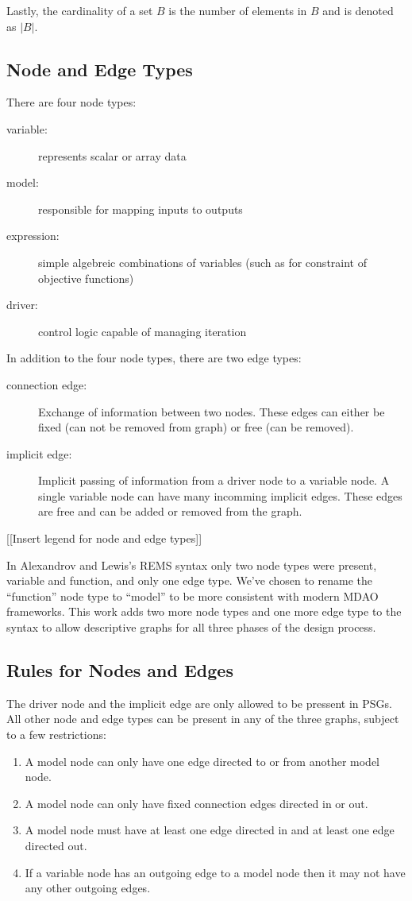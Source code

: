 Lastly, the cardinality of a set $B$ is the number of elements in $B$ and is denoted as $|B|$.


\subsection{Node and Edge Types}

There are four node types:  
\begin{description}
\item[variable: ] represents scalar or array data
\item[model:] responsible for mapping inputs to outputs
\item[expression:] simple algebreic combinations of variables (such as for 
  constraint of objective functions)
\item[driver:] control logic capable of managing iteration
\end{description}

In addition to the four node types, there are two edge types: 

\begin{description}
\item[connection edge:] Exchange of information between two nodes. These edges 
can either be fixed (can not be removed from graph) or free (can be removed). 
\item [implicit edge:] Implicit passing of information from a driver node to a 
  variable node. A single variable node can have many incomming implicit edges. These edges are 
  free and can be added or removed from the graph. 
\end{description}

[[Insert legend for node and edge types]]

In Alexandrov and Lewis's REMS syntax only two node types were present, variable 
and function, and only one edge type\cite{alexandrov2004}. We've chosen to rename the ``function'' node 
type to ``model'' to be more consistent with modern MDAO frameworks. This work 
adds two more node types and one more edge type to the syntax to allow descriptive
graphs for all three phases of the design process. 

\subsection{Rules for Nodes and Edges}

The driver node and the implicit edge are only allowed to be pressent in PSGs. All 
other node and edge types can be present in any of the three graphs, subject to a 
few restrictions: 
\begin{enumerate}
\item A model node can only have one edge directed to or from another model node.
\item A model node can only have fixed connection edges directed in or out.
\item A model node must have at least one edge directed in and at least one edge 
  directed out.
\item If a variable node has an outgoing edge to a model node then it may not have 
  any other outgoing edges.
\end{enumerate}

